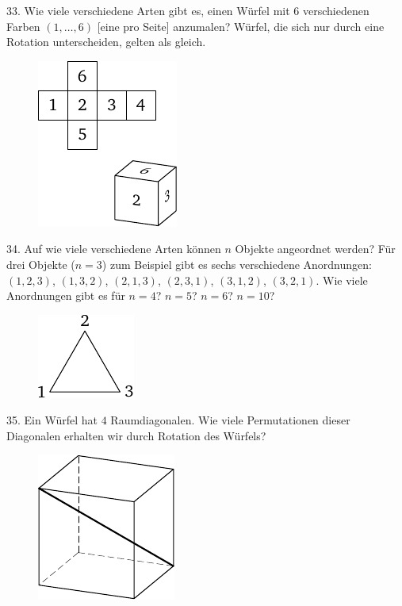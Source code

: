 \begin{problem}{33.}
	Wie viele verschiedene Arten gibt es, einen Würfel mit $6$ verschiedenen Farben $(1,\dotsc,6)$ [eine pro Seite] anzumalen? Würfel, die sich nur durch eine Rotation unterscheiden, gelten als gleich.
	\begin{figure}
		\includegraphics{resources/taskbook-17}
	\end{figure}
\end{problem}

\begin{problem}{34.}
	Auf wie viele verschiedene Arten können $n$ Objekte angeordnet werden?
	Für drei Objekte ($n=3$) zum Beispiel gibt es sechs verschiedene Anordnungen: $(1,2,3)$, $(1,3,2)$, $(2,1,3)$, $(2,3,1)$, $(3,1,2)$, $(3,2,1)$.
	Wie viele Anordnungen gibt es für $n=4$? $n=5$? $n=6$? $n=10$?
	\begin{figure}
		\includegraphics{resources/taskbook-18}
	\end{figure}
\end{problem}

\begin{problem}{35.}
	Ein Würfel hat $4$ Raumdiagonalen. Wie viele Permutationen dieser Diagonalen erhalten wir durch Rotation des Würfels?
	\begin{figure}
		\includegraphics{resources/taskbook-19}
	\end{figure}
\end{problem}

